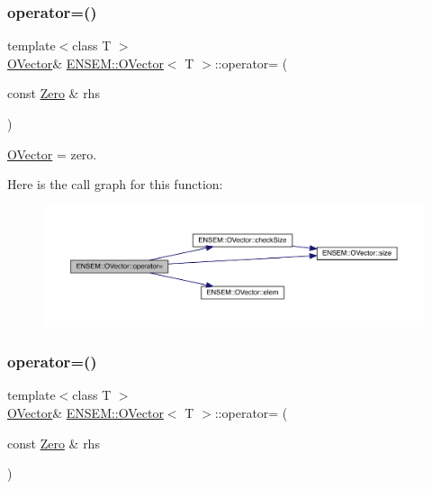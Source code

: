 \subsubsection{\texorpdfstring{operator=()}{operator=()}\hspace{0.1cm}{\footnotesize\ttfamily [1/8]}}
{\footnotesize\ttfamily template$<$class T $>$ \\
\mbox{\hyperlink{classENSEM_1_1OVector}{O\+Vector}}\& \mbox{\hyperlink{classENSEM_1_1OVector}{E\+N\+S\+E\+M\+::\+O\+Vector}}$<$ T $>$\+::operator= (\begin{DoxyParamCaption}\item[{const \mbox{\hyperlink{structENSEM_1_1Zero}{Zero}} \&}]{rhs }\end{DoxyParamCaption})\hspace{0.3cm}{\ttfamily [inline]}}



\mbox{\hyperlink{classENSEM_1_1OVector}{O\+Vector}} = zero. 

Here is the call graph for this function\+:
\nopagebreak
\begin{figure}[H]
\begin{center}
\leavevmode
\includegraphics[width=350pt]{d0/d8d/classENSEM_1_1OVector_a54123bea722ddb2b3eaea0c948735b13_cgraph}
\end{center}
\end{figure}
\mbox{\label{classENSEM_1_1OVector_a54123bea722ddb2b3eaea0c948735b13}} 
\subsubsection{\texorpdfstring{operator=()}{operator=()}\hspace{0.1cm}{\footnotesize\ttfamily [2/8]}}
{\footnotesize\ttfamily template$<$class T $>$ \\
\mbox{\hyperlink{classENSEM_1_1OVector}{O\+Vector}}\& \mbox{\hyperlink{classENSEM_1_1OVector}{E\+N\+S\+E\+M\+::\+O\+Vector}}$<$ T $>$\+::operator= (\begin{DoxyParamCaption}\item[{const \mbox{\hyperlink{structENSEM_1_1Zero}{Zero}} \&}]{rhs }\end{DoxyParamCaption})\hspace{0.3cm}{\ttfamily [inline]}}



